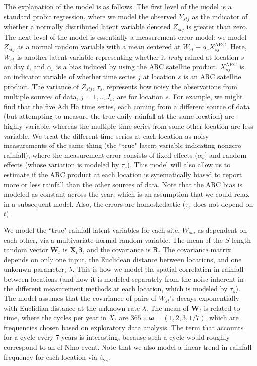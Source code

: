 \documentclass[12pt]{article}
\def\bbeta{\pmb{\beta}}
\def\bomega{\pmb{\omega}}
\def\bX{\pmb{X}}
\def\bR{\pmb{R}}
\def\bW{\pmb{W}}
\begin{document}
The explanation of the model is as follows. The first level of the model is a standard probit regression, where we model the observed $Y_{stj}$ as the indicator of whether a normally distributed latent variable denoted $Z_{stj}$ is greater than zero. The next level of the model is essentially a measurement error model: we model $Z_{stj}$ as a normal random variable with a mean centered at $W_{st} + \alpha_s X^\text{ARC}_{sj}$. Here, $W_{st}$ is another latent variable representing whether it \emph{truly} rained at location $s$ on day $t$, and $\alpha_s$ is a bias induced by using the ARC satellite product. $X^\text{ARC}_{sj}$ is an indicator variable of whether time series $j$ at location $s$ is an ARC satellite product. The variance of $Z_{stj}$, $\tau_s$, represents how noisy the observations from multiple sources of data, $j=1,..,J_s$, are for location $s$. For example, we might find that the five Adi Ha time series, each coming from a different source of data (but attempting to measure the true daily rainfall at the same location) are highly variable, whereas the multiple time series from some other location are less variable. We treat the different time series at each location as noisy measurements of the same thing (the ``true" latent variable indicating nonzero rainfall), where the measurement error consists of fixed effects ($\alpha_s$) and random effects (whose variation is modeled by $\tau_s$). This model will also allow us to estimate if the ARC product at each location is sytematically biased to report more or less rainfall than the other sources of data. Note that the ARC bias is modeled as constant across the year, which is an assumption that we could relax in a subsequent model. Also, the errors are homoskedastic ($\tau_s$ does not depend on $t$).

We model the ``true" rainfall latent variables for each site, $W_{st}$, as dependent on each other, via a multivariate normal random variable. The mean of the $S$-length random vector $\bW_t$ is $\bX_t \bbeta$, and the covariance is $\bR$. The covariance matrix depends on only one input, the Euclidean distance between locations, and one unkonwn parameter, $\lambda$. This is how we model the spatial correlation in rainfall between locations (and how it is modeled separately from the noise inherent in the different measurement methods at each location, which is modeled by $\tau_s$). The model assumes that the covariance of pairs of $W_{st}$'s decays exponentially with Euclidian distance at the unknown rate $\lambda$. The mean of $\bW_t$ is related to time, where the cycles per year in $X_t$ are $365 \times \bomega = (1, 2, 3, 1/7)$, which are frequencies chosen based on exploratory data analysis. The term that accounts for a cycle every 7 years is interesting, because such a cycle would roughly correspond to an el Nino event. Note that we also model a linear trend in rainfall frequency for each location via $\beta_{2s}$.
\end{document}
